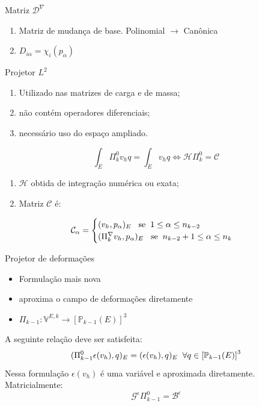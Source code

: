 \documentclass{beamer}
\begin{document}
\begin{frame}{Matriz $\mathcal{D}^\nabla$}
    \begin{enumerate}
        \item Matriz de mudança de base. Polinomial $\rightarrow$ Canônica
        \item $D_{i\alpha} = \chi_i(p_\alpha)$
    \end{enumerate}
\end{frame}

\begin{frame}{Projetor $L^2$}
    \begin{enumerate}
        \item Utilizado nas matrizes de carga e de massa;
        \item não contém operadores diferenciais;
        \item necessário uso do espaço ampliado. 
    \end{enumerate} \pause
    $$\int_E \Pi_k^0 v_h q = \int_E v_h q \Leftrightarrow \mathcal{H} \Pi_k^0 = \mathcal{C}$$ \pause 
    \begin{enumerate}
        \item $\mathcal{H}$ obtida de integração numérica ou exata;
        \item Matriz $\mathcal{C}$ é:
    \end{enumerate}
    $$\mathcal{C}_{\alpha} = \begin{cases}
        (v_h,p_\alpha)_E \hspace{3mm} \text{se} \hspace{2mm} 1 \leq \alpha \leq n_{k-2} \\
        (\Pi_k^\nabla v_h,p_\alpha)_E \hspace{3mm} \text{se} \hspace{2mm} n_{k-2}+1 \leq \alpha \leq n_{k}
    \end{cases}$$
\end{frame}

\begin{frame}{Projetor de deformações}
    \begin{itemize}
        \item Formulação mais nova
        \item aproxima o campo de deformações diretamente
        \item $\Pi_{k-1}: \mathbb{V}^{E,k} \rightarrow \left[\mathbb{P}_{k-1}(E)\right]^3$
    \end{itemize}\pause
    A seguinte relação deve ser satisfeita:
    $$(\Pi^0_{k-1} \epsilon(v_h),q)_E = (\epsilon(v_h),q)_E \hspace{2mm} \forall q\in \left[\mathbb{P}_{k-1}(E)\right]^3$$
    Nessa formulação $\epsilon(v_h)$ é uma variável e aproximada diretamente. Matricialmente:
    $$\mathcal{G}^\epsilon \Pi_{k-1}^0 = \mathcal{B}^\epsilon$$
\end{frame}
\end{document}
